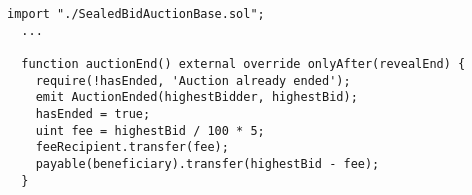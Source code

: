 \begin{lstlisting}[language=Solidity]
import "./SealedBidAuctionBase.sol";
  ...

  function auctionEnd() external override onlyAfter(revealEnd) {
    require(!hasEnded, 'Auction already ended');
    emit AuctionEnded(highestBidder, highestBid);
    hasEnded = true;
    uint fee = highestBid / 100 * 5;
    feeRecipient.transfer(fee);
    payable(beneficiary).transfer(highestBid - fee);
  }
\end{lstlisting}